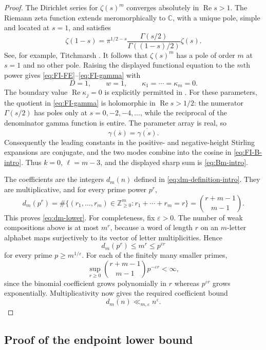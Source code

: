 \documentclass[11pt]{amsart}
\theoremstyle{plain}
\theoremstyle{definition}
\theoremstyle{remark}
\newcommand{\C}{\mathbb C}
\numberwithin{equation}{section}
\begin{document}
\begin{proof}
The Dirichlet series for $\zeta(s)^m$ converges absolutely in $\operatorname{Re}s>1$.  The Riemann zeta function extends meromorphically to $\C$, with a unique pole, simple and located at $s=1$, and satisfies
\[
  \zeta(1-s)
  =\pi^{1/2-s}
  \frac{\Gamma(s/2)}{\Gamma((1-s)/2)}\zeta(s).
\]
See, for example, Titchmarsh \cite[Theorem~2.1]{Titchmarsh}.  It follows that $\zeta(s)^m$ has a pole of order $m$ at $s=1$ and no other pole.  Raising the displayed functional equation to the $m$th power gives \eqref{eq:FI-FE}--\eqref{eq:FI-gamma} with
\[
  D=1,\qquad w=1,\qquad \kappa_1=\cdots=\kappa_m=0.
\]
The boundary value $\operatorname{Re}\kappa_j=0$ is explicitly permitted in \cite[(1.4)]{FriedlanderIwaniec}.  For these parameters, the quotient in \eqref{eq:FI-gamma} is holomorphic in $\operatorname{Re}s>1/2$: the numerator $\Gamma(s/2)$ has poles only at $s=0,-2,-4,\ldots$, while the reciprocal of the denominator gamma function is entire.  The parameter array is real, so
\[
  \gamma(\overline{s})=\overline{\gamma(s)}.
\]
Consequently the leading constants in the positive- and negative-height Stirling expansions are conjugate, and the two modes combine into the cosine in \eqref{eq:FI-B-intro}.  Thus $k=0$, $\ell=m-3$, and the displayed sharp sum is \eqref{eq:Bm-intro}.

The coefficients are the integers $d_m(n)$ defined in \eqref{eq:dm-definition-intro}.  They are multiplicative, and for every prime power $p^r$,
\[
  d_m(p^r)=\#\{(r_1,\ldots,r_m)\in\mathbb Z_{\ge0}^m:
                    r_1+\cdots+r_m=r\}
           =\binom{r+m-1}{m-1}.
\]
This proves \eqref{eq:dm-lower}.  For completeness, fix $\varepsilon>0$.  The number of weak compositions above is at most $m^r$, because a word of length $r$ on an $m$-letter alphabet maps surjectively to its vector of letter multiplicities.  Hence
\[
  d_m(p^r)\le m^r\le p^{\varepsilon r}
\]
for every prime $p\ge m^{1/\varepsilon}$.  For each of the finitely many smaller primes,
\[
  \sup_{r\ge0}\binom{r+m-1}{m-1}p^{-\varepsilon r}<\infty,
\]
since the binomial coefficient grows polynomially in $r$ whereas $p^{\varepsilon r}$ grows exponentially.  Multiplicativity now gives the required coefficient bound
\[
  d_m(n)\ll_{m,\varepsilon}n^\varepsilon.
\]
\end{proof}



\subsection{Proof of the endpoint lower bound}
\end{document}
